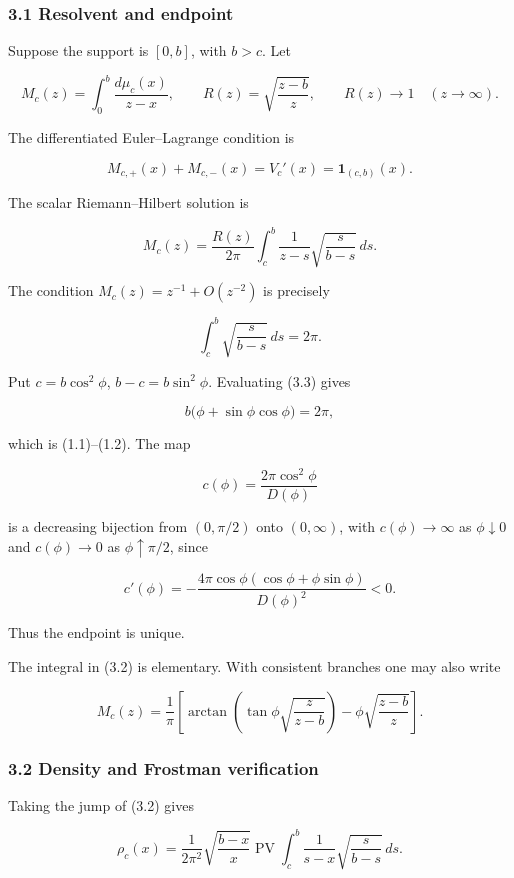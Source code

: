\documentclass[11pt]{article}
\theoremstyle{keio}
\theoremstyle{definition}
\theoremstyle{remark}
\begin{document}
\subsubsection{3.1 Resolvent and endpoint}

Suppose the support is \([0,b]\), with \(b>c\). Let

\[
M_c(z)=\int_0^b\frac{d\mu_c(x)}{z-x},
\qquad
R(z)=\sqrt{\frac{z-b}{z}},\qquad R(z)\to1\quad(z\to\infty).
\]

The differentiated Euler--Lagrange condition is

\[
M_{c,+}(x)+M_{c,-}(x)=V_c'(x)
=\mathbf1_{(c,b)}(x). \tag{DS-3.1}
\]

The scalar Riemann--Hilbert solution is

\[
M_c(z)=\frac{R(z)}{2\pi}
\int_c^b\frac{1}{z-s}\sqrt{\frac{s}{b-s}}\,ds. \tag{DS-3.2}
\]

The condition \(M_c(z)=z^{-1}+O(z^{-2})\) is precisely

\[
\int_c^b\sqrt{\frac{s}{b-s}}\,ds=2\pi. \tag{DS-3.3}
\]

Put \(c=b\cos^2\phi\), \(b-c=b\sin^2\phi\). Evaluating (3.3) gives

\[
b\bigl(\phi+\sin\phi\cos\phi\bigr)=2\pi,
\]

which is (1.1)--(1.2). The map

\[
c(\phi)=\frac{2\pi\cos^2\phi}{D(\phi)}
\]

is a decreasing bijection from \((0,\pi/2)\) onto \((0,\infty)\), with
\(c(\phi)\to\infty\) as \(\phi\downarrow0\) and \(c(\phi)\to0\) as
\(\phi\uparrow\pi/2\), since

\[
c'(\phi)
=-\frac{4\pi\cos\phi(\cos\phi+\phi\sin\phi)}{D(\phi)^2}<0. \tag{DS-3.4}
\]

Thus the endpoint is unique.

The integral in (3.2) is elementary. With consistent branches one may also
write

\[
\boxed{
M_c(z)=\frac1\pi\left[
\arctan\left(\tan\phi\sqrt{\frac{z}{z-b}}\right)
-\phi\sqrt{\frac{z-b}{z}}
\right].} \tag{DS-3.5}
\]

\subsubsection{3.2 Density and Frostman verification}

Taking the jump of (3.2) gives

\[
\rho_c(x)=\frac1{2\pi^2}\sqrt{\frac{b-x}{x}}
\operatorname{PV}\!\int_c^b
\frac1{s-x}\sqrt{\frac{s}{b-s}}\,ds. \tag{DS-3.6}
\]
\end{document}
